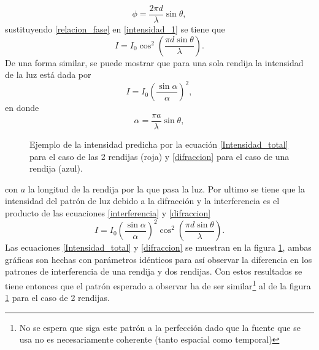 \documentclass[%
 reprint,
 amsmath,amssymb,
 aps,
]{revtex4-1}
\begin{document}
\begin{equation}
\phi = \frac{2\pi d}{\lambda}\sin\theta,
\label{relacion_fase}
\end{equation}
sustituyendo \eqref{relacion_fase} en \eqref{intensidad_1} se tiene que
\begin{equation}
I=I_0\cos^2\left(\frac{\pi d \sin\theta}{\lambda}\right).
\label{interferencia}
\end{equation}
De una forma similar, se puede mostrar que para una sola rendija la intensidad  de la luz está dada por
\begin{equation}
I=I_0\left(\frac{\sin\alpha}{\alpha}\right)^2,
\label{difraccion}
\end{equation}
en donde
\begin{equation}
\alpha=\frac{\pi a}{\lambda}\sin\theta,
\end{equation}
\begin{figure}[h]
\caption{\label{ejemplo interferencia} Ejemplo de la intensidad predicha por la ecuación \eqref{Intensidad_total} para el caso de las 2 rendijas (roja) y \eqref{difraccion} para el caso de una rendija (azul).}
\end{figure}
con $a$ la longitud de la rendija por la que pasa la luz. Por ultimo se tiene que la intensidad del patrón de luz debido a la difracción y la interferencia es el producto de las ecuaciones \eqref{interferencia} y \eqref{difraccion}
\begin{equation}
I=I_0\left(\frac{\sin\alpha}{\alpha}\right)^2\cos^2\left(\frac{\pi d \sin\theta}{\lambda}\right).
\label{Intensidad_total}
\end{equation}
Las ecuaciones \eqref{Intensidad_total} y \eqref{difraccion} se muestran en la figura \ref{ejemplo interferencia}, ambas gráficas son hechas con parámetros idénticos para así observar la diferencia en los patrones de interferencia de una rendija y dos rendijas. Con estos resultados se tiene entonces que el patrón esperado a observar ha de ser similar\footnote{No se espera que siga este patrón a la perfección dado que la fuente que se usa no es necesariamente coherente (tanto espacial como temporal)} al de la figura \ref{ejemplo interferencia} para el caso de 2 rendijas. 
\end{document}
